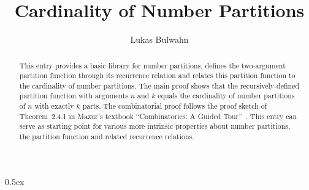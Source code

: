\documentclass[11pt,a4paper]{article}
\begin{document}
\title{Cardinality of Number Partitions}
\author{Lukas Bulwahn}
\maketitle

\begin{abstract}
This entry provides a basic library for number partitions, defines the
two-argument partition function through its recurrence relation and relates
this partition function to the cardinality of number partitions. The main
proof shows that the recursively-defined partition function with arguments
$n$ and $k$ equals the cardinality of number partitions of $n$ with exactly
$k$ parts. The combinatorial proof follows the proof sketch of Theorem~2.4.1
in Mazur's textbook ``Combinatorics: A Guided Tour''~\cite{mazur-2010}. This
entry can serve as starting point for various more intrinsic properties about
number partitions, the partition function and related recurrence relations.

\end{abstract}

\tableofcontents

\parindent 0pt\parskip 0.5ex



\nocite{*}



\end{document}
